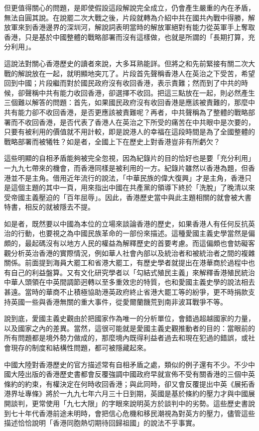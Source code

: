 但更值得關心的問題，是即使假設這段解說完全成立，仍會產生嚴重的內在矛盾，無法自圓其說。在說罷二次大戰之後，片段就轉為介紹中共在國共內戰中得勝，解放軍來到香港邊界的深圳河，解說詞表明當時的解放軍絕對有能力從英軍手上奪取香港，只是基於中國整體的戰略部署而沒有這樣做，也就是所謂的「長期打算，充分利用」。

這說法對關心香港歷史的讀者來說，大多耳熟能詳。但將之和先前緊接有關二次大戰的解說放在一起，就明顯地突兀了。片段首先聲稱香港人在英治之下受苦，希望回到中國；片段繼而對於國民政府沒有收回香港，表示責難；然而到了中共的時候，卻聲稱中共有能力收回香港，卻選擇不收回。把這三點放在一起，則必然產生三個難以解答的問題：首先，如果國民政府沒有收回香港是應該被責難的，那麼中共有能力卻不收回香港，是否更應該被責難呢？再者，中共聲稱為了整體的戰略部署而不收回香港，是否代表了香港人在英治之下所受的痛苦在中共眼中是次要的，只要有被利用的價值就不用計較，即是說港人的幸福在這段時間是為了全國整體的戰略部署而被犧牲？如是者，全國上下在歷史上對香港豈非有所虧欠？

這些明顯的自相矛盾能夠被完全忽視，因為紀錄片的目的恰好也是要「充分利用」一九九七帶來的機會，而香港同樣是被利用的一方。紀錄片雖然以香港為題，但香港並不是主角。借用近年流行的說法，「中華民族的偉大復興」才是主角，香港只是這個主題的其中一頁，用來指出中國在共產黨的領導下終於「洗脫」了晚清以來受帝國主義壓迫的「百年屈辱」。因此，香港歷史當中與此主題相關的就會被大書特書，相反的就被隱去不提。

如是者，既然要以中國為本位的立場來談論香港的歷史，如果香港人有任何反抗英治的行動，也要視之為中國民族革命的一部份來描述。這種愛國主義史學當然是偏頗的，最起碼沒有以地方人民的權益為解釋歷史的首要考慮。而這偏頗也會妨礙客觀分析英治香港的實際情況，例如華人社會內部以及統治者和被統治者之間的複雜關係。前面提到海員大罷工和省港大罷工，有歷史學者就提出在港華商於過程中也有自己的利益盤算。又有文化研究學者以「勾結式殖民主義」來解釋香港殖民統治中華人頭領在中英間調節迥轉以至多重效忠的特質，也和愛國主義史學的說法相去甚遠。當時的華商不止積極協助港英政府終止省港大罷工等的紛爭，更不時捐款支持英國一些與香港無關的重大事件，從愛爾蘭饑荒到南非波耳戰爭不等。

說到底，愛國主義史觀由於把國家作為唯一的分析單位，會錯過超越國家的力量，以及國家之內的差異。當然，這很可能就是愛國主義史觀推動者的目的：當眼前的所有問題都是境外勢力做成的，那麼境內既得利益者過去和現在犯過的錯誤，或社會現存的制度和結構性問題，都可被隱藏起來。

中國大陸對香港歷史的官方描述常有自相矛盾之處，類似的例子還有不少。不少中國大陸出版的香港歷史書都會反覆強調中國政府早就宣佈不受有關香港的三個中英條約的約束，有權決定在何時收回香港；與此同時，卻又會反覆提出中英《展拓香港界址專條》將於一九九七年六月三十日到期，英國是基於條約的壓力才與中國展開談判，更常使用「九七大限」的字眼來說明英方於談判中的劣勢。這些歷史書說到七十年代香港前途未明時，會把信心危機和移民潮視為對英方的壓力，儘管這些描述恰恰說明「香港同胞熱切期待回歸祖國」的說法不乎事實。

